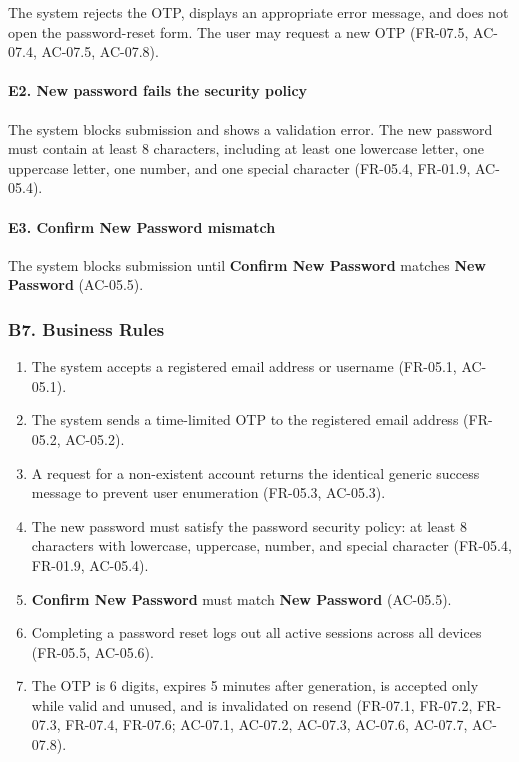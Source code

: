 \documentclass[12pt]{article}
\begin{document}
The system rejects the OTP, displays an appropriate error message, and does not open the password-reset form. The user may request a new OTP (FR-07.5, AC-07.4, AC-07.5, AC-07.8).
\par\medskip

\hypertarget{sec:e2-new-password-fails-the-security-policy}{}
\paragraph*{E2. New password fails the security policy}
\par\medskip

The system blocks submission and shows a validation error. The new password must contain at least 8 characters, including at least one lowercase letter, one uppercase letter, one number, and one special character (FR-05.4, FR-01.9, AC-05.4).
\par\medskip

\hypertarget{sec:e3-confirm-new-password-mismatch}{}
\paragraph*{E3. Confirm New Password mismatch}
\par\medskip

The system blocks submission until \textbf{Confirm New Password} matches \textbf{New Password} (AC-05.5).
\par\medskip

\hypertarget{sec:b7-business-rules}{}
\subsubsection*{B7. Business Rules}
\par\medskip

\begin{enumerate}
\item The system accepts a registered email address or username (FR-05.1, AC-05.1).
\item The system sends a time-limited OTP to the registered email address (FR-05.2, AC-05.2).
\item A request for a non-existent account returns the identical generic success message to prevent user enumeration (FR-05.3, AC-05.3).
\item The new password must satisfy the password security policy: at least 8 characters with lowercase, uppercase, number, and special character (FR-05.4, FR-01.9, AC-05.4).
\item \textbf{Confirm New Password} must match \textbf{New Password} (AC-05.5).
\item Completing a password reset logs out all active sessions across all devices (FR-05.5, AC-05.6).
\item The OTP is 6 digits, expires 5 minutes after generation, is accepted only while valid and unused, and is invalidated on resend (FR-07.1, FR-07.2, FR-07.3, FR-07.4, FR-07.6; AC-07.1, AC-07.2, AC-07.3, AC-07.6, AC-07.7, AC-07.8).
\end{enumerate}
\par\medskip
\end{document}
